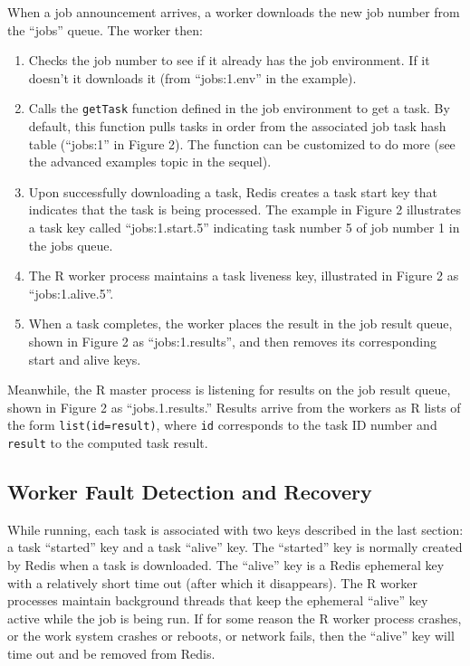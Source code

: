 \documentclass[12pt]{article}
\begin{document}
When a job announcement arrives, a worker downloads the new job number
from the ``jobs'' queue. The worker then:
\begin{enumerate}
\item Checks the job number to see if it already has the job environment.
If it doesn't it downloads it (from ``jobs:1.env'' in the example).
\item Calls the \verb+getTask+ function defined in the job environment to
get a task. By default, this function pulls tasks in order from the
associated job task hash table (``jobs:1'' in Figure 2). The function
can be customized to do more (see the advanced examples topic in the sequel).
\item Upon successfully downloading a task, Redis
creates a task start key that indicates that the task is being processed.
The example in Figure 2 illustrates a task key called ``jobs:1.start.5''
indicating task number 5 of job number 1 in the jobs queue.
\item The R worker process maintains a task liveness key, illustrated
in Figure 2 as ``jobs:1.alive.5''.
\item When a task completes, the worker places the result in the job
result queue, shown in Figure 2 as ``jobs:1.results'', and then
removes its corresponding start and alive keys.
\end{enumerate}

Meanwhile, the R master process is listening for results on the job result
queue, shown in Figure 2 as ``jobs.1.results.'' Results arrive from the workers
as R lists of the form \verb+list(id=result)+, where \verb+id+ corresponds to
the task ID number and \verb+result+ to the computed task result.


\subsection{Worker Fault Detection and Recovery}

While running, each task is associated with two keys described in the last
section: a task ``started'' key and a task ``alive'' key. The ``started'' key
is normally created by Redis when a task is downloaded. The ``alive'' key is a
Redis ephemeral key with a relatively short time out (after which it
disappears). The R worker processes maintain background threads that keep the
ephemeral ``alive'' key active while the job is being run. If for some reason
the R worker process crashes, or the work system crashes or reboots, or network
fails, then the ``alive'' key will time out and be removed from Redis.
\end{document}
